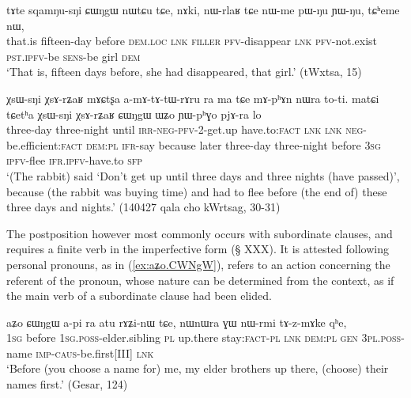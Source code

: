 \begin{exe}
\ex \label{ex:sqamNusNi.CWNgW}
 \gll tɤte sqamŋu-sŋi ɕɯŋgɯ nɯtɕu tɕe, nɤki, nɯ-rlaʁ tɕe nɯ-me pɯ-ŋu ɲɯ-ŋu, tɕʰeme nɯ, \\
 that.is fifteen-day before \textsc{dem}.\textsc{loc} \textsc{lnk} \textsc{filler} \textsc{pfv}-disappear \textsc{lnk} \textsc{pfv}-not.exist \textsc{pst}.\textsc{ipfv}-be \textsc{sens}-be girl \textsc{dem} \\
 \glt `That is, fifteen days before, she had disappeared, that girl.' (tWxtsa, 15)
\end{exe}


\begin{exe}
\ex \label{ex:XsArZaR.CWNgW}
 \gll χsɯ-sŋi χsɤ-rʑaʁ mɤɕtʂa a-mɤ-tɤ-tɯ-rɤru ra ma tɕe mɤ-pʰɤn nɯra to-ti. matɕi tɕetʰa χsɯ-sŋi χsɤ-rʑaʁ ɕɯŋgɯ ɯʑo ɲɯ-pʰɣo pjɤ-ra lo \\
 three-day  three-night until \textsc{irr}-\textsc{neg}-\textsc{pfv}-2-get.up have.to:\textsc{fact} \textsc{lnk} \textsc{lnk}  \textsc{neg}-be.efficient:\textsc{fact} \textsc{dem}:\textsc{pl} \textsc{ifr}-say because later   three-day  three-night before \textsc{3sg} \textsc{ipfv}-flee \textsc{ifr}.\textsc{ipfv}-have.to \textsc{sfp} \\
 \glt `(The rabbit) said `Don't get up until three days and three nights (have passed)', because (the rabbit was buying time) and had to flee before (the end of) these three days and nights.' (140427 qala cho kWrtsag, 30-31)
\end{exe}

The postposition    however most commonly occurs with subordinate clauses, and requires a finite verb in the imperfective form (§ XXX). It is attested following personal pronouns, as in (\ref{ex:aʑo.CWNgW}),   refers to an action concerning the referent of the pronoun, whose nature can be determined from the context, as if the main verb of a subordinate clause had been elided.

\begin{exe}
\ex \label{ex:aʑo.CWNgW}
 \gll  aʑo ɕɯŋgɯ a-pi ra atu rɤʑi-nɯ tɕe, nɯnɯra ɣɯ nɯ-rmi tɤ-z-mɤke qʰe, \\
 \textsc{1sg} before \textsc{1sg}.\textsc{poss}-elder.sibling \textsc{pl} up.there stay:\textsc{fact}-\textsc{pl} \textsc{lnk} \textsc{dem}:\textsc{pl} \textsc{gen} \textsc{3pl}.\textsc{poss}-name \textsc{imp}-\textsc{caus}-be.first[III] \textsc{lnk} \\
 \glt `Before (you choose a name for) me, my elder brothers up there, (choose) their names first.' (Gesar, 124)
\end{exe}



